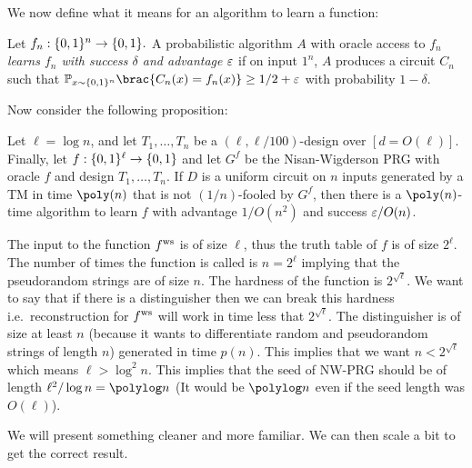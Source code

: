 We now define what it means for an algorithm to learn a function:
\begin{definition}
	Let $f_n : \{0, 1\}^n \to \{0, 1\}.$ A probabilistic algorithm $A$ with
	oracle access to $f_n$ \emph{learns $f_n$ with success $\delta$ and advantage
		$\varepsilon$} if on input $1^n$, $A$ produces a circuit $C_n$ such that
	$\Pr_{x \sim \{0, 1\}^n} \brac{C_n(x) = f_n(x)} \geq 1/2 + \eps$ with
	probability $1 - \delta$.
\end{definition}

Now consider the following proposition:

\begin{proposition}\label{prop:learning-func}
	Let $\ell = \log{n}$, and let $T_1, \dots, T_n$ be
	a $(\ell, \ell/100)$-design over $[d=O(\ell)]$. Finally, let $f :
	\{0,1\}^\ell \to \{0, 1\}$ and let $G^f$ be the Nisan-Wigderson PRG with
	oracle $f$ and design $T_1, \dots, T_n$. If $D$ is a uniform circuit on $n$
	inputs generated by a TM in time $\poly(n)$ that is not $(1/n)$-fooled by $G^f$, then
	there is a $\poly(n)$-time algorithm to learn $f$ with advantage $1/O(n^2)$ and
	success $\varepsilon/O(n)$.
\end{proposition}

The input to the function $ f^{\text{ws}} $ is of size $\ell$, thus the truth table of $f$ is of size $2^{\ell}$. The number of times the function is called is $n = 2^{\ell}$ implying that the pseudorandom strings are of size $n$.
The hardness of the function is $2^{\sqrt{\ell}}$. We want to say that if there is a distinguisher then we can break this hardness i.e.\ reconstruction for $ f^{\text{ws}} $ will work in time less that $2^{\sqrt{\ell}}$.
The distinguisher is of size at least $n$ (because it wants to differentiate random and pseudorandom strings of length $n$) generated in time $p(n)$. This implies that we want $n < 2^{\sqrt{\ell}}$ which means $\ell > \log^2 n$. This implies that the seed of NW-PRG should be of length $\ell^2/\log n = \polylog n$ (It would be $\polylog n$ even if the seed length was $O(\ell)$).

We will present something cleaner and more familiar. We can then scale a bit to get the correct result.

